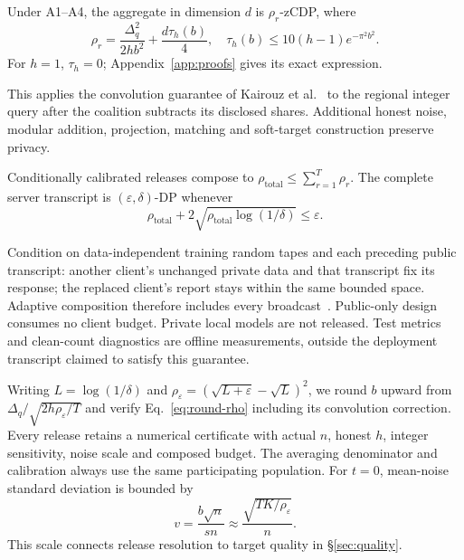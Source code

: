 \begin{theorem}
\label{thm:round}
Under A1--A4, the aggregate in dimension $d$ is $\rho_r$-zCDP, where
\begin{equation}
\rho_r=\frac{\Delta_q^2}{2hb^2}+\frac{d\tau_h(b)}4,
\quad \tau_h(b)\le10(h-1)e^{-\pi^2b^2}.
\label{eq:round-rho}
\end{equation}
For $h=1$, $\tau_h=0$; Appendix~\ref{app:proofs} gives its exact expression.
\end{theorem}

This applies the convolution guarantee of Kairouz et
al.~\cite{kairouz2021distributed} to the regional integer query after the
coalition subtracts its disclosed shares. Additional honest noise, modular
addition, projection, matching and soft-target construction preserve privacy.

\begin{theorem}
\label{thm:run}
Conditionally calibrated releases compose to
$\rho_{\mathrm{total}}\le\sum_{r=1}^T\rho_r$.
The complete server transcript is $(\varepsilon,\delta)$-DP whenever
\begin{equation}
\rho_{\mathrm{total}}+2\sqrt{\rho_{\mathrm{total}}\log(1/\delta)}
\le\varepsilon.
\label{eq:accounting}
\end{equation}
\end{theorem}

Condition on data-independent training random tapes and each preceding public
transcript: another client's unchanged private data and that transcript fix its response;
the replaced client's report stays within the same bounded space.
Adaptive composition therefore includes every broadcast~\cite{bun2016concentrated}.
Public-only design consumes no client budget. Private local models are not
released. Test metrics and clean-count diagnostics are offline measurements,
outside the deployment transcript claimed to satisfy this guarantee.

Writing $L=\log(1/\delta)$ and
$\rho_\varepsilon=(\sqrt{L+\varepsilon}-\sqrt L)^2$,
we round $b$ upward from $\Delta_q/\sqrt{2h\rho_\varepsilon/T}$ and verify
Eq.~\eqref{eq:round-rho} including its convolution correction.
Every release retains a numerical certificate with actual $n$, honest $h$,
integer sensitivity, noise scale and composed budget. The averaging denominator
and calibration always use the same participating population.
For $t=0$, mean-noise standard deviation is bounded by
\begin{equation}
v=\frac{b\sqrt n}{sn}\approx\frac{\sqrt{TK/\rho_\varepsilon}}{n}.
\label{eq:design-budget}
\end{equation}
This scale connects release resolution to target quality in \S\ref{sec:quality}.
